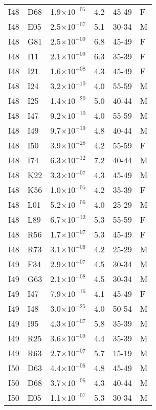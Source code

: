 \begin{longtable}{lllrll}
   I48 & D68 & 1.9$\times10^{-05}$ & 4.2 & 45-49 & F \\ 
   I48 & E05 & 2.5$\times10^{-07}$ & 5.1 & 30-34 & M \\ 
   I48 & G81 & 2.5$\times10^{-09}$ & 6.8 & 45-49 & F \\ 
   I48 & I11 & 2.1$\times10^{-09}$ & 6.3 & 35-39 & F \\ 
   I48 & I21 & 1.6$\times10^{-08}$ & 4.3 & 45-49 & F \\ 
   I48 & I24 & 3.2$\times10^{-10}$ & 4.0 & 55-59 & M \\ 
   I48 & I25 & 1.4$\times10^{-20}$ & 5.0 & 40-44 & M \\ 
   I48 & I47 & 9.2$\times10^{-10}$ & 4.0 & 55-59 & M \\ 
   I48 & I49 & 9.7$\times10^{-19}$ & 4.8 & 40-44 & M \\ 
   I48 & I50 & 3.9$\times10^{-28}$ & 4.2 & 55-59 & F \\ 
   I48 & I74 & 6.3$\times10^{-12}$ & 7.2 & 40-44 & M \\ 
   I48 & K22 & 3.3$\times10^{-07}$ & 4.3 & 45-49 & M \\ 
   I48 & K56 & 1.0$\times10^{-05}$ & 4.2 & 35-39 & F \\ 
   I48 & L01 & 5.2$\times10^{-06}$ & 4.0 & 25-29 & M \\ 
   I48 & L89 & 6.7$\times10^{-12}$ & 5.3 & 55-59 & F \\ 
   I48 & R56 & 1.7$\times10^{-07}$ & 5.3 & 45-49 & F \\ 
   I48 & R73 & 3.1$\times10^{-06}$ & 4.2 & 25-29 & M \\ 
   I49 & F34 & 2.9$\times10^{-07}$ & 4.5 & 30-34 & M \\ 
   I49 & G63 & 2.1$\times10^{-08}$ & 4.5 & 30-34 & M \\ 
   I49 & I47 & 7.9$\times10^{-16}$ & 4.1 & 45-49 & F \\ 
   I49 & I48 & 3.0$\times10^{-25}$ & 4.0 & 50-54 & M \\ 
   I49 & I95 & 4.3$\times10^{-07}$ & 5.8 & 35-39 & M \\ 
   I49 & R25 & 3.6$\times10^{-09}$ & 4.4 & 35-39 & M \\ 
   I49 & R63 & 2.7$\times10^{-07}$ & 5.7 & 15-19 & M \\ 
   I50 & D63 & 4.4$\times10^{-06}$ & 4.8 & 45-49 & M \\ 
   I50 & D68 & 3.7$\times10^{-06}$ & 4.3 & 40-44 & M \\ 
   I50 & E05 & 1.1$\times10^{-07}$ & 5.3 & 30-34 & M \\ 

\end{longtable}
